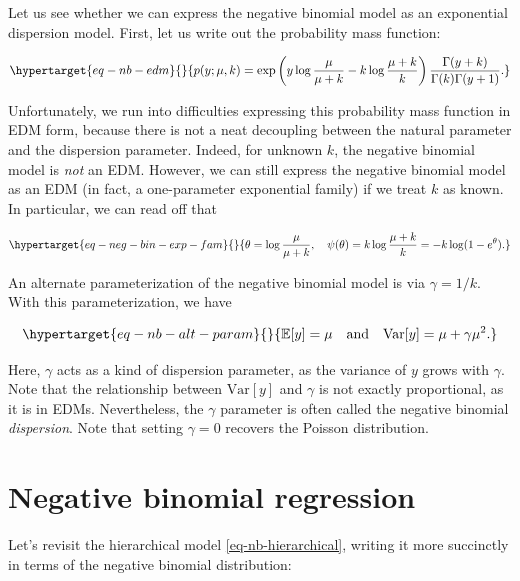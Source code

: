 \documentclass[
  11pt,
  letterpaper,
  oneside]{book}
\theoremstyle{plain}
\theoremstyle{plain}
\theoremstyle{definition}
\theoremstyle{definition}
\theoremstyle{plain}
\theoremstyle{remark}
\begin{document}
Let us see whether we can express the negative binomial model as an
exponential dispersion model. First, let us write out the probability
mass function:

\begin{equation}\protect\hypertarget{eq-nb-edm}{}{
p(y; \mu, k) = \exp\left(y \log \frac{\mu}{\mu + k} - k \log \frac{\mu + k}{k}\right)\frac{\Gamma(y+k)}{\Gamma(k)\Gamma(y+1)}.
}\label{eq-nb-edm}\end{equation}

Unfortunately, we run into difficulties expressing this probability mass
function in EDM form, because there is not a neat decoupling between the
natural parameter and the dispersion parameter. Indeed, for unknown
\(k\), the negative binomial model is \emph{not} an EDM. However, we can
still express the negative binomial model as an EDM (in fact, a
one-parameter exponential family) if we treat \(k\) as known. In
particular, we can read off that

\begin{equation}\protect\hypertarget{eq-neg-bin-exp-fam}{}{
\theta = \log \frac{\mu}{\mu + k}, \quad \psi(\theta) = k\log \frac{\mu + k}{k} = -k\log(1-e^{\theta}).
}\label{eq-neg-bin-exp-fam}\end{equation}

An alternate parameterization of the negative binomial model is via
\(\gamma = 1/k\). With this parameterization, we have

\begin{equation}\protect\hypertarget{eq-nb-alt-param}{}{
\mathbb{E}[y] = \mu \quad \text{and} \quad \text{Var}[y] = \mu + \gamma \mu^2.
}\label{eq-nb-alt-param}\end{equation}

Here, \(\gamma\) acts as a kind of dispersion parameter, as the variance
of \(y\) grows with \(\gamma\). Note that the relationship between
\(\text{Var}[y]\) and \(\gamma\) is not exactly proportional, as it is
in EDMs. Nevertheless, the \(\gamma\) parameter is often called the
negative binomial \emph{dispersion}. Note that setting \(\gamma = 0\)
recovers the Poisson distribution.

\hypertarget{negative-binomial-regression}{%
\section{Negative binomial
regression}\label{negative-binomial-regression}}

Let's revisit the hierarchical model \ref{eq-nb-hierarchical}, writing
it more succinctly in terms of the negative binomial distribution:
\end{document}
